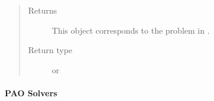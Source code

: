 \documentclass[letterpaper,10pt,english]{sphinxmanual}
\begin{document}
\begin{fulllineitems}
\begin{quote}
\begin{description}
\begin{itemize}
\end{itemize}

\item[{Returns}] \leavevmode
This object corresponds to the problem in .

\item[{Return type}] \leavevmode
{\hyperref[\detokenize{reference/mpr:pao.mpr.repn.LinearMultilevelProblem}]{}} or {\hyperref[\detokenize{reference/mpr:pao.mpr.repn.QuadraticMultilevelProblem}]{}}

\end{description}\end{quote}

\end{fulllineitems}



\paragraph{PAO Solvers}
\label{\detokenize{reference/pyomo:pao-solvers}}
\end{document}
